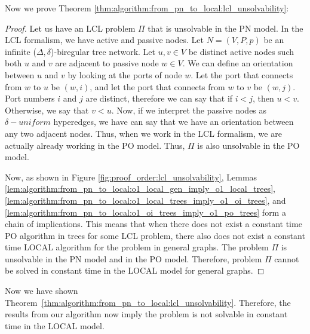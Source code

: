 Now we prove Theorem \ref{thm:algorithm:from_pn_to_local:lcl_unsolvability}:
\begin{proof}
    Let us have an LCL problem $\Pi$ that is unsolvable in the PN model.
    In the LCL formalism, we have active and passive nodes.
    Let $N = (V, P, p)$ be an infinite ($\Delta, \delta$)-biregular tree network.
    Let $u, v \in V$ be distinct active nodes such both $u$ and $v$ are adjacent to passive node $w\in V$.
    We can define an orientation between $u$ and $v$ by looking at the ports of node $w$.
    Let the port that connects from $w$ to $u$ be $(w, i)$, and let the port that connects from $w$ to $v$ be $(w, j)$.
    Port numbers $i$ and $j$ are distinct, therefore we can say that if $i < j$, then $u < v$.
    Otherwise, we say that $v < u$.
    Now, if we interpret the passive nodes as $\delta-uniform$ hyperedges, we have can say that we have an orientation between any two adjacent nodes.
    Thus, when we work in the LCL formalism, we are actually already working in the PO model.
    Thus, $\Pi$ is also unsolvable in the PO model.

    Now, as shown in Figure \ref{fig:proof_order:lcl_unsolvability}, Lemmas \ref{lem:algorithm:from_pn_to_local:o1_local_gen_imply_o1_local_trees}, \ref{lem:algorithm:from_pn_to_local:o1_local_trees_imply_o1_oi_trees}, and \ref{lem:algorithm:from_pn_to_local:o1_oi_trees_imply_o1_po_trees} form a chain of implications.
    This means that when there does not exist a constant time PO algorithm in trees for some LCL problem, there also does not exist a constant time LOCAL algorithm for the problem in general graphs.
    The problem $\Pi$ is unsolvable in the PN model and in the PO model.
    Therefore, problem $\Pi$ cannot be solved in constant time in the LOCAL model for general graphs.
\end{proof}



Now we have shown Theorem~\ref{thm:algorithm:from_pn_to_local:lcl_unsolvability}.
Therefore, the results from our algorithm now imply the problem is not solvable in constant time in the LOCAL model.
